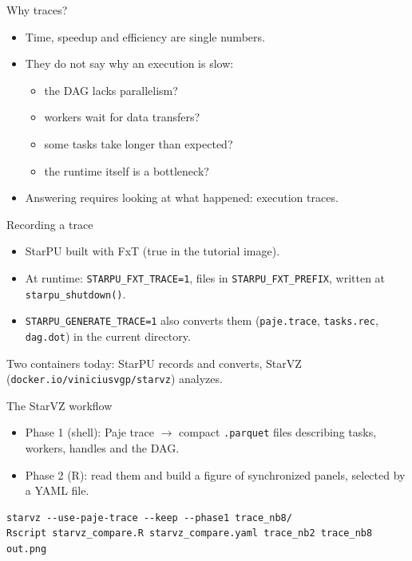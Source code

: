 \documentclass[presentation, aspectratio=169]{beamer}
\begin{document}
\begin{frame}[label={sec:org0e36c73}]{Why traces?}
\begin{itemize}
\item Time, speedup and efficiency are single numbers.
\item They do not say \alert{why} an execution is slow:
\begin{itemize}
\item the DAG lacks parallelism?
\item workers wait for data transfers?
\item some tasks take longer than expected?
\item the runtime itself is a bottleneck?
\end{itemize}
\item Answering requires looking at what happened: \alert{execution traces}.
\end{itemize}
\end{frame}
\begin{frame}[label={sec:org545ece6},fragile]{Recording a trace}
 \begin{itemize}
\item StarPU built with FxT (true in the tutorial image).
\item At runtime: \texttt{STARPU\_FXT\_TRACE=1}, files in \texttt{STARPU\_FXT\_PREFIX},
written at \texttt{starpu\_shutdown()}.
\item \texttt{STARPU\_GENERATE\_TRACE=1} also converts them (\texttt{paje.trace},
\texttt{tasks.rec}, \texttt{dag.dot}) in the current directory.
\end{itemize}

Two containers today: StarPU records and converts, StarVZ
(\texttt{docker.io/viniciusvgp/starvz}) analyzes.
\end{frame}
\begin{frame}[label={sec:orgfc209ae},fragile]{The StarVZ workflow}
 \begin{itemize}
\item \alert{Phase 1} (shell): Paje trace \(\rightarrow\) compact \texttt{.parquet}
files describing tasks, workers, handles and the DAG.
\item \alert{Phase 2} (R): read them and build a figure of synchronized panels,
selected by a YAML file.
\end{itemize}

\scriptsize
\begin{verbatim}
starvz --use-paje-trace --keep --phase1 trace_nb8/
Rscript starvz_compare.R starvz_compare.yaml trace_nb2 trace_nb8 out.png
\end{verbatim}
\end{frame}
\end{document}
